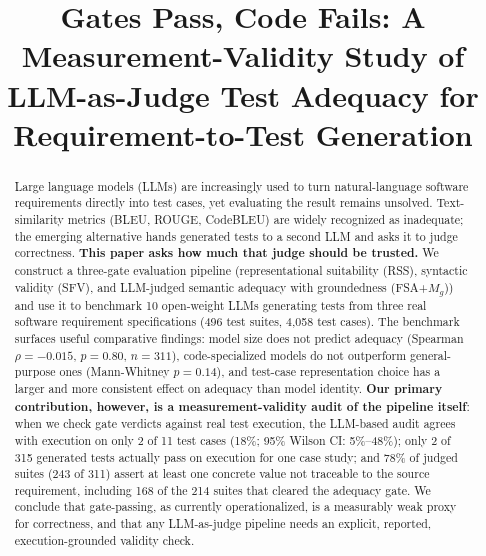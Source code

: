 \documentclass[conference]{IEEEtran}
\begin{document}
\title{Gates Pass, Code Fails: A Measurement-Validity Study of LLM-as-Judge Test Adequacy for Requirement-to-Test Generation}

\author{
}

\maketitle

\begin{abstract}
Large language models (LLMs) are increasingly used to turn natural-language software requirements directly into test cases, yet evaluating the result remains unsolved. Text-similarity metrics (BLEU, ROUGE, CodeBLEU) are widely recognized as inadequate; the emerging alternative hands generated tests to a second LLM and asks it to judge correctness. \textbf{This paper asks how much that judge should be trusted.} We construct a three-gate evaluation pipeline (representational suitability (RSS), syntactic validity (SFV), and LLM-judged semantic adequacy with groundedness (FSA+$M_g$)) and use it to benchmark 10 open-weight LLMs generating tests from three real software requirement specifications (496 test suites, 4{,}058 test cases). The benchmark surfaces useful comparative findings: model size does not predict adequacy (Spearman $\rho=-0.015$, $p=0.80$, $n=311$), code-specialized models do not outperform general-purpose ones (Mann-Whitney $p=0.14$), and test-case representation choice has a larger and more consistent effect on adequacy than model identity. \textbf{Our primary contribution, however, is a measurement-validity audit of the pipeline itself}: when we check gate verdicts against real test execution, the LLM-based audit agrees with execution on only 2 of 11 test cases (18\%; 95\% Wilson CI: 5\%--48\%); only 2 of 315 generated tests actually pass on execution for one case study; and 78\% of judged suites (243 of 311) assert at least one concrete value not traceable to the source requirement, including 168 of the 214 suites that cleared the adequacy gate. We conclude that gate-passing, as currently operationalized, is a measurably weak proxy for correctness, and that any LLM-as-judge pipeline needs an explicit, reported, execution-grounded validity check.
\end{abstract}
\end{document}
